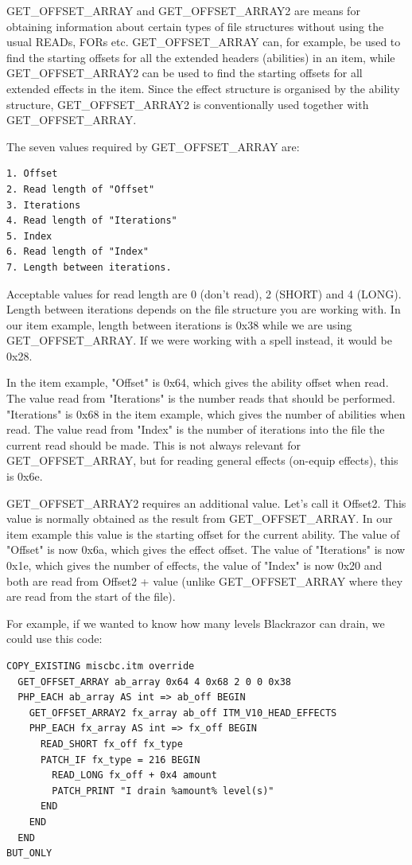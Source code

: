 \documentclass{article}
\begin{document}
GET_OFFSET_ARRAY and GET_OFFSET_ARRAY2 are means for obtaining information about certain types of file structures without using the usual READs, FORs etc. GET_OFFSET_ARRAY can, for example, be used to find the starting offsets for all the extended headers (abilities) in an item, while GET_OFFSET_ARRAY2 can be used to find the starting offsets for all extended effects in the item. Since the effect structure is organised by the ability structure, GET_OFFSET_ARRAY2 is conventionally used together with GET_OFFSET_ARRAY.

The seven values required by GET_OFFSET_ARRAY are:
\begin{verbatim}
1. Offset
2. Read length of "Offset"
3. Iterations
4. Read length of "Iterations"
5. Index
6. Read length of "Index"
7. Length between iterations.
\end{verbatim}

Acceptable values for read length are 0 (don't read), 2 (SHORT) and 4 (LONG). Length between iterations depends on the file structure you are working with. In our item example, length between iterations is 0x38 while we are using GET_OFFSET_ARRAY. If we were working with a spell instead, it would be 0x28.

In the item example, "Offset" is 0x64, which gives the ability offset when read.
The value read from "Iterations" is the number reads that should be performed. "Iterations" is 0x68 in the item example, which gives the number of abilities when read.
The value read from "Index" is the number of iterations into the file the current read should be made. This is not always relevant for GET_OFFSET_ARRAY, but for reading general effects (on-equip effects), this is 0x6e.

GET_OFFSET_ARRAY2 requires an additional value. Let's call it Offset2. This value is normally obtained as the result from GET_OFFSET_ARRAY. In our item example this value is the starting offset for the current ability. The value of "Offset" is now 0x6a, which gives the effect offset. The value of "Iterations" is now 0x1e, which gives the number of effects, the value of "Index" is now 0x20 and both are read from Offset2 + value (unlike GET_OFFSET_ARRAY where they are read from the start of the file).

For example, if we wanted to know how many levels Blackrazor can drain, we could use this code:
\begin{verbatim}
COPY_EXISTING miscbc.itm override
  GET_OFFSET_ARRAY ab_array 0x64 4 0x68 2 0 0 0x38
  PHP_EACH ab_array AS int => ab_off BEGIN
    GET_OFFSET_ARRAY2 fx_array ab_off ITM_V10_HEAD_EFFECTS
    PHP_EACH fx_array AS int => fx_off BEGIN
      READ_SHORT fx_off fx_type
      PATCH_IF fx_type = 216 BEGIN
        READ_LONG fx_off + 0x4 amount
        PATCH_PRINT "I drain %amount% level(s)"
      END
    END
  END
BUT_ONLY
\end{verbatim}
\end{document}
